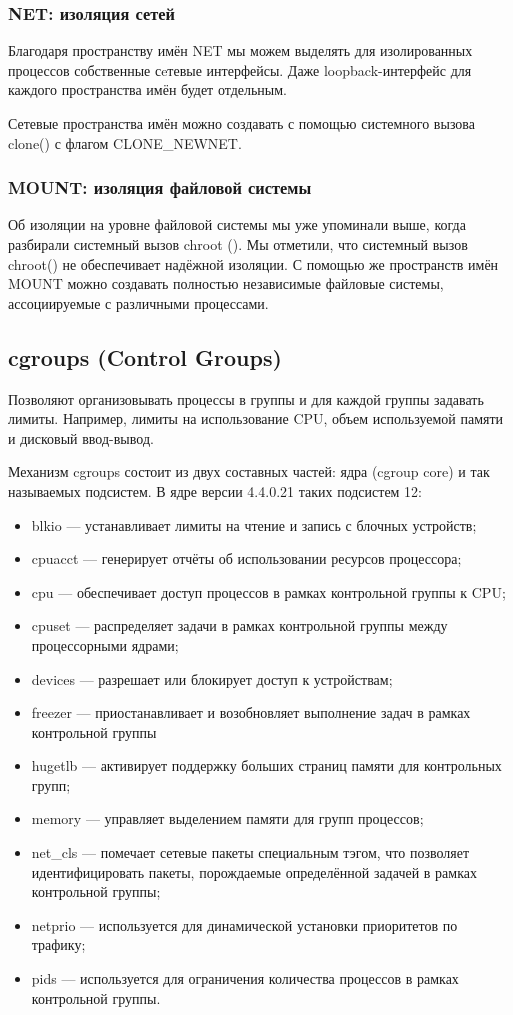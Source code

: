 \subsubsection{NET: изоляция сетей}

Благодаря пространству имён NET мы можем выделять для изолированных процессов собственные сeтевые интерфейсы. Даже loopback-интерфейс для каждого пространства имён будет отдельным.

Сетевые пространства имён можно создавать с помощью системного вызова clone() с флагом CLONE\_NEWNET. 

\subsubsection{MOUNT: изоляция файловой системы}

Об изоляции на уровне файловой системы мы уже упоминали выше, когда разбирали системный вызов chroot (). Мы отметили, что системный вызов chroot() не обеспечивает надёжной изоляции. С помощью же пространств имён MOUNT можно создавать полностью независимые файловые системы, ассоциируемые с различными процессами.

\subsection{cgroups (Control Groups)}

Позволяют организовывать процессы в группы и для каждой группы задавать лимиты. Например, лимиты на использование CPU, объем используемой памяти и дисковый ввод-вывод.

Механизм cgroups состоит из двух составных частей: ядра (cgroup core) и так называемых подсистем. В ядре версии 4.4.0.21 таких подсистем 12:

\begin{itemize}
\item blkio — устанавливает лимиты на чтение и запись с блочных устройств;
\item cpuacct — генерирует отчёты об использовании ресурсов процессора;
\item cpu — обеспечивает доступ процессов в рамках контрольной группы к CPU;
\item cpuset — распределяет задачи в рамках контрольной группы между процессорными ядрами;
\item devices — разрешает или блокирует доступ к устройствам;
\item freezer — приостанавливает и возобновляет выполнение задач в рамках контрольной группы
\item hugetlb — активирует поддержку больших страниц памяти для контрольных групп;
\item memory — управляет выделением памяти для групп процессов;
\item net\_cls — помечает сетевые пакеты специальным тэгом, что позволяет идентифицировать пакеты, порождаемые определённой задачей в рамках контрольной группы;
\item netprio — используется для динамической установки приоритетов по трафику;
\item pids — используется для ограничения количества процессов в рамках контрольной группы.
\end{itemize}

